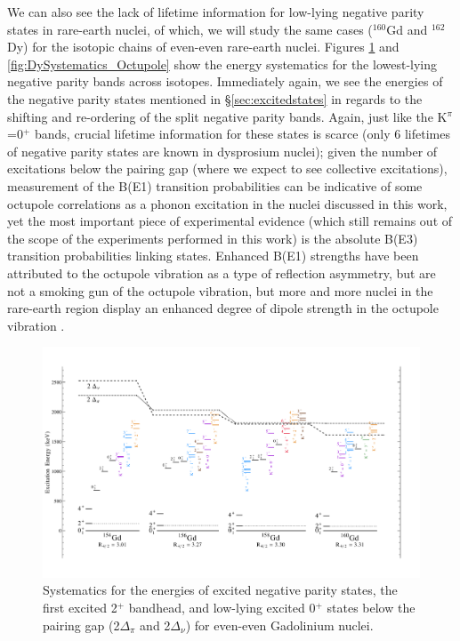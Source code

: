 We can also see the lack of lifetime information for low-lying negative parity states in rare-earth nuclei, of which, we will study the same cases ($^{160}$Gd and $^{162}$Dy) for the isotopic chains of even-even rare-earth nuclei. Figures \ref{fig:GdSystematics_Octupole} and \ref{fig:DySystematics_Octupole} show the energy systematics for the lowest-lying negative parity bands across isotopes. Immediately again, we see the energies of the negative parity states mentioned in \S \ref{sec:excitedstates} in regards to the shifting and re-ordering of the split negative parity bands. Again, just like the K$^\pi$=0$^+$ bands, crucial lifetime information for these states is scarce (only 6 lifetimes of negative parity states are known in dysprosium nuclei); given the number of excitations below the pairing gap (where we expect to see collective excitations), measurement of the B(E1) transition probabilities can be indicative of some octupole correlations as a phonon excitation in the nuclei discussed in this work, yet the most important piece of experimental evidence (which still remains out of the scope of the experiments performed in this work) is the absolute B(E3) transition probabilities linking states. Enhanced B(E1) strengths have been attributed to the octupole vibration as a type of reflection asymmetry, but are not a smoking gun of the octupole vibration, but more and more nuclei in the rare-earth region display an enhanced degree of dipole strength in the octupole vibration \cite{Soloviev_QuadHex,Pascu_octupole_2015}. 

\begin{landscape}
\begin{figure}[ht] 
\begin{center}
\includegraphics[height=0.8\textheight]{figures/SciDraw_Gd_Octupole_Systematics_FULL.pdf}
\caption{Systematics for the energies of excited negative parity states, the first excited 2$^+$ bandhead, and low-lying excited 0$^+$ states below the pairing gap (2$\Delta_\pi$ and 2$\Delta_\nu$) for even-even Gadolinium nuclei.
\label{fig:GdSystematics_Octupole}}
\end{center}
\end{figure}
\end{landscape}

